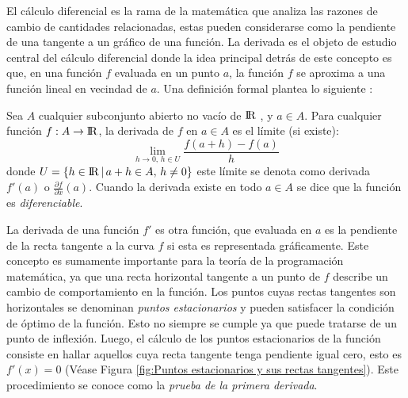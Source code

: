 El cálculo diferencial es la rama de la matemática que analiza las razones de cambio de cantidades relacionadas, estas pueden considerarse como la pendiente de una tangente a un gráfico de una función. La derivada es el objeto de estudio central del cálculo diferencial donde la idea principal detrás de este concepto es que, en una función $f$ evaluada en un punto $a$, la función $f$ se aproxima a una función lineal en vecindad de $a$. Una definición formal plantea lo siguiente \cite{jean_algebra_2017}:
\begin{defn}

Sea $A$  cualquier subconjunto abierto no vacío de ${\rm I\!R}$ , y $a \in A$. Para cualquier función $f: A \rightarrow {\rm I\!R}$, la derivada de $f$ en $a \in A$ es el límite (si existe):
\begin{equation}
\lim_{h\to 0, \, h \in U} \frac{f(a+h)-f(a)}{h}
\end{equation}
donde $U =\{h \in {\rm I\!R}\,|\, a+h \in A, \, h \neq 0 \}$ este límite se denota como derivada $f'(a)$ o $\frac{\partial f}{\partial x}(a)$. Cuando la derivada existe en todo $a \in A$ se dice que la función es \textit{diferenciable}.
\end{defn}

La derivada de una función $f'$ es otra función, que evaluada en $a$ es la pendiente de la recta tangente a la curva $f$ si esta es representada gráficamente. Este concepto es sumamente importante para la teoría de la programación matemática, ya que una recta horizontal tangente a un punto de $f$ describe un cambio de comportamiento en la función. Los puntos cuyas rectas tangentes son horizontales se denominan \textit{puntos estacionarios} y pueden satisfacer la condición de óptimo de la función. Esto no siempre se cumple ya que puede tratarse de un punto de inflexión. Luego, el cálculo de los puntos estacionarios de la función consiste en hallar aquellos cuya recta tangente tenga pendiente igual cero, esto es $f'(x)=0$ (Véase Figura \ref{fig:Puntos estacionarios y sus rectas tangentes}). Este procedimiento se conoce como la \textit{prueba de la primera derivada}.

